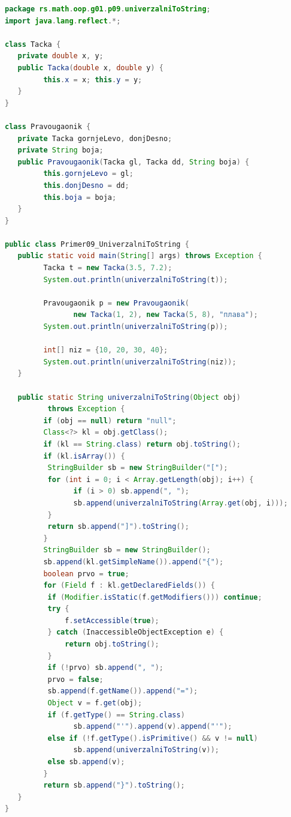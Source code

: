 \begin{lstlisting}[language=Java]
package rs.math.oop.g01.p09.univerzalniToString;
import java.lang.reflect.*;
 
class Tacka {
   private double x, y;
   public Tacka(double x, double y) {
         this.x = x; this.y = y;
   }
}
 
class Pravougaonik {
   private Tacka gornjeLevo, donjDesno;
   private String boja;
   public Pravougaonik(Tacka gl, Tacka dd, String boja) {
         this.gornjeLevo = gl;
         this.donjDesno = dd;
         this.boja = boja;
   }
}
 
public class Primer09_UniverzalniToString {
   public static void main(String[] args) throws Exception {
         Tacka t = new Tacka(3.5, 7.2);
         System.out.println(univerzalniToString(t));
 
         Pravougaonik p = new Pravougaonik(
                new Tacka(1, 2), new Tacka(5, 8), "плава");
         System.out.println(univerzalniToString(p));
 
         int[] niz = {10, 20, 30, 40};
         System.out.println(univerzalniToString(niz));
   }
 
   public static String univerzalniToString(Object obj)
          throws Exception {
         if (obj == null) return "null";
         Class<?> kl = obj.getClass();
         if (kl == String.class) return obj.toString();
         if (kl.isArray()) {
          StringBuilder sb = new StringBuilder("[");
          for (int i = 0; i < Array.getLength(obj); i++) {
                if (i > 0) sb.append(", ");
                sb.append(univerzalniToString(Array.get(obj, i)));
          }
          return sb.append("]").toString();
         }
         StringBuilder sb = new StringBuilder();
         sb.append(kl.getSimpleName()).append("{");
         boolean prvo = true;
         for (Field f : kl.getDeclaredFields()) {
          if (Modifier.isStatic(f.getModifiers())) continue;
          try {
              f.setAccessible(true);
          } catch (InaccessibleObjectException e) {
              return obj.toString();
          }
          if (!prvo) sb.append(", ");
          prvo = false;
          sb.append(f.getName()).append("=");
          Object v = f.get(obj);
          if (f.getType() == String.class)
                sb.append("'").append(v).append("'");
          else if (!f.getType().isPrimitive() && v != null)
                sb.append(univerzalniToString(v));
          else sb.append(v);
         }
         return sb.append("}").toString();
   }
}
\end{lstlisting}



